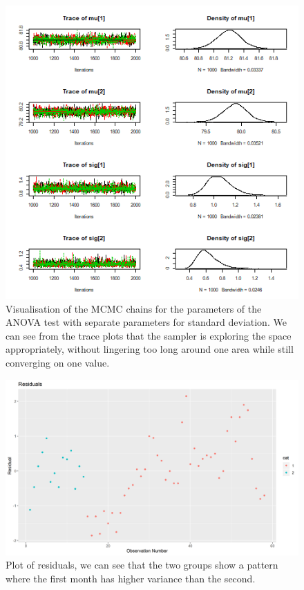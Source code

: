 \documentclass[journal, a4paper]{IEEEtran}
\begin{document}
\begin{figure}[h!]
	\includegraphics{../plots/04_chains_ANOVA_2.png}
	\caption{Visualisation of the MCMC chains for the parameters of the ANOVA test with separate parameters for standard deviation. We can see from the trace 
	plots that the sampler is exploring the space appropriately, without lingering too long around one area while still converging on one value.}
	\label{fig:6}
\end{figure}

\begin{figure}[h!]
	\includegraphics[width=\linewidth]{../plots/06_mod1_resid_1.png}
	\caption{Plot of residuals, we can see that the two groups show a pattern where the first month has higher variance than the second.}
	\label{fig:7}
\end{figure}
\end{document}
